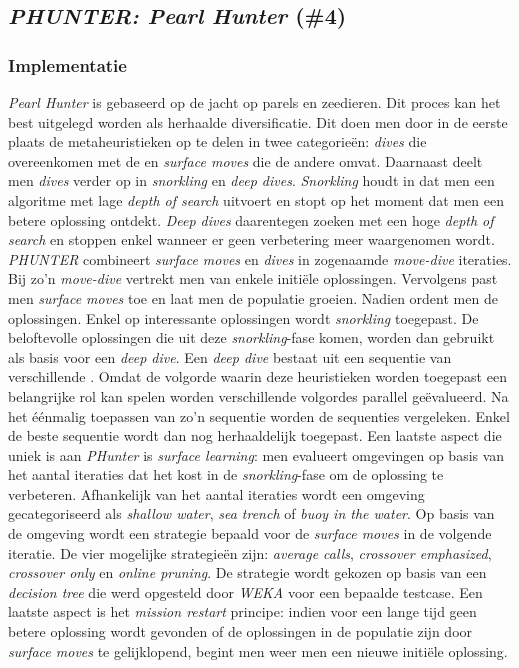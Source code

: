 \subsection{\emph{PHUNTER: Pearl Hunter} (\#4)}
\label{sss:phunter}
\subsubsection{Implementatie}
\emph{Pearl Hunter}\cite{chesc-phunter} is gebaseerd op de jacht op parels en zeedieren. Dit proces kan het best uitgelegd worden als herhaalde diversificatie. Dit doen men door in de eerste plaats de metaheuristieken op te delen in twee categorie\"en: \emph{dives} die overeenkomen met de \abls{} \abllhn{} en \emph{surface moves} die de andere \abhn{} omvat. Daarnaast deelt men \emph{dives} verder op in \emph{snorkling} en \emph{deep dives}. \emph{Snorkling} houdt in dat men een \abls{} algoritme met lage \emph{depth of search} uitvoert en stopt op het moment dat men een betere oplossing ontdekt. \emph{Deep dives} daarentegen zoeken met een hoge \emph{depth of search} en stoppen enkel wanneer er geen verbetering meer waargenomen wordt. \emph{PHUNTER} combineert \emph{surface moves} en \emph{dives} in zogenaamde \emph{move-dive} iteraties. Bij zo'n \emph{move-dive} vertrekt men van enkele initi\"ele oplossingen. Vervolgens past men \emph{surface moves} toe en laat men de populatie groeien. Nadien ordent men de oplossingen. Enkel op interessante oplossingen wordt \emph{snorkling} toegepast. De beloftevolle oplossingen die uit deze \emph{snorkling}-fase komen, worden dan gebruikt als basis voor een \emph{deep dive}. Een \emph{deep dive} bestaat uit een sequentie van verschillende \abls{} \abllhn{}. Omdat de volgorde waarin deze heuristieken worden toegepast een belangrijke rol kan spelen worden verschillende volgordes parallel ge\"evalueerd. Na het \'e\'enmalig toepassen van zo'n sequentie worden de sequenties vergeleken. Enkel de beste sequentie wordt dan nog herhaaldelijk toegepast. Een laatste aspect die uniek is aan \emph{PHunter} is \emph{surface learning}: men evalueert omgevingen op basis van het aantal \abls{} iteraties dat het kost in de \emph{snorkling}-fase om de oplossing te verbeteren. Afhankelijk van het aantal iteraties wordt een omgeving gecategoriseerd als \emph{shallow water}, \emph{sea trench} of \emph{buoy in the water}. Op basis van de omgeving wordt een strategie bepaald voor de \emph{surface moves} in de volgende iteratie. De vier mogelijke strategie\"en zijn: \emph{average calls}, \emph{crossover emphasized}, \emph{crossover only} en \emph{online pruning}. De strategie wordt gekozen op basis van een \emph{decision tree} die werd opgesteld door \emph{WEKA} voor een bepaalde testcase. Een laatste aspect is het \emph{mission restart} principe: indien voor een lange tijd geen betere oplossing wordt gevonden of de oplossingen in de populatie zijn door \emph{surface moves} te gelijklopend, begint men weer men een nieuwe initi\"ele oplossing.
